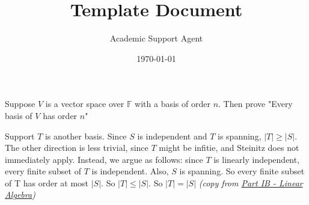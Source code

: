 \documentclass{article}
\title{Template Document}
\author{Academic Support Agent}
\date{\today}
\begin{document}
\maketitle

\begin{question}
Suppose $V$ is a vector space over $\mathbb{F}$ with a basis of order $n$. Then prove "Every basis of $V$ has order $n$" 
\end{question}

\begin{My Answer}
Support $T$ is another basis. Since $S$ is independent and $T$ is spanning, $|T| \geq |S|$. The other direction is less trivial, since $T$ might be infitie, and Steinitz does not immediately apply.  Instead, we argue as follows: since $T$ is
linearly independent, every finite subset of $T$ is independent. Also, $S$ is spanning. So every finite subset of T has order at most $|S|$. So $|T| \leq |S|$.
So $|T| = |S|$ \textit{(copy from \href{https://dec41.user.srcf.net/notes/IB_M/linear_algebra_thm_proof.pdf}{Part IB - Linear Algebra})}
\end{My Answer}
\end{document}
